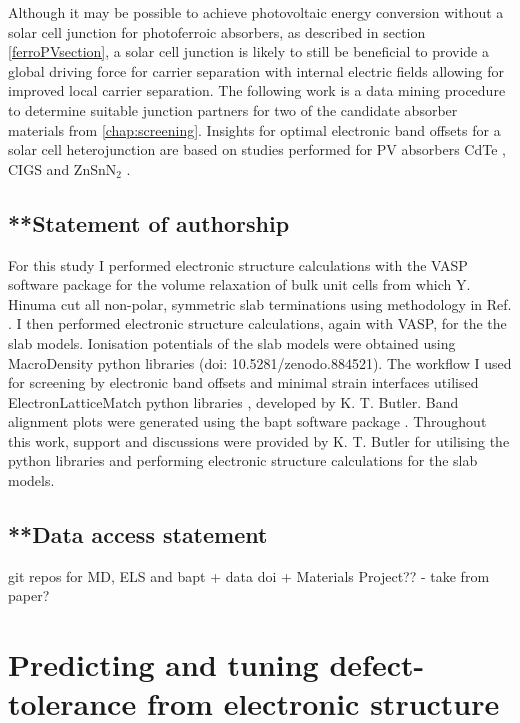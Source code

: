 \documentclass[11pt, twoside]{report}
\begin{document}
Although it may be possible to achieve photovoltaic energy conversion without a solar cell junction for photoferroic absorbers, as described in section \ref{ferroPVsection}, a solar cell junction is likely to still be beneficial to provide a global driving force for carrier separation with internal electric fields allowing for improved local carrier separation. The following work is a data mining procedure to determine suitable junction partners for two of the candidate absorber materials from \autoref{chap:screening}. Insights for optimal electronic band offsets for a solar cell heterojunction are based on studies performed for PV absorbers CdTe \cite{CdTe_spike}, CIGS \cite{p-type_spike} and ZnSnN$_2$ \cite{Elisabetta}.

\subsection{**Statement of authorship}
For this study I performed electronic structure calculations with the VASP \cite{VASP} software package for the volume relaxation of bulk unit cells from which Y. Hinuma cut all non-polar, symmetric slab terminations using methodology in Ref. . I then performed electronic structure calculations, again with VASP, for the the slab models. Ionisation potentials of the slab models were obtained using MacroDensity python libraries (doi: 10.5281/zenodo.884521). The workflow I used for screening by electronic band offsets and minimal strain interfaces utilised ElectronLatticeMatch python libraries \cite{ELS}, developed by K. T. Butler. Band alignment plots were generated using the bapt software package \cite{bapt}. Throughout this work, support and discussions were provided by K. T. Butler for utilising the python libraries and performing electronic structure calculations for the slab models.

\subsection{**Data access statement}
git repos for MD, ELS and bapt + data doi + Materials Project?? - take from paper?





\section{Predicting and tuning defect-tolerance from electronic structure}\label{sulfosalt_defects}
\end{document}
